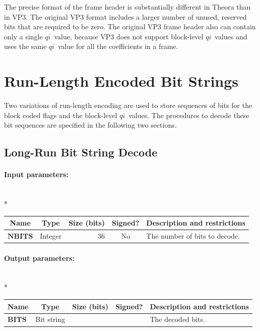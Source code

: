 \documentclass[11pt,letterpaper]{book}
\newcommand{\idx}[1]{{\ensuremath{\mathit{#1}}}}
\newcommand{\qi}{\idx{qi}}
\newcommand{\bitvar}[1]{\ensuremath{\mathbf{\bm #1}}}
\numberwithin{equation}{chapter}
\numberwithin{figure}{chapter}
\numberwithin{table}{chapter}
\begin{document}
The precise format of the frame header is substantially different in Theora
 than in VP3.
The original VP3 format includes a larger number of unused, reserved bits that
 are required to be zero.
The original VP3 frame header also can contain only a single \qi\ value,
 because VP3 does not support block-level \qi\ values and uses the same
 \qi\ value for all the coefficients in a frame.

\section{Run-Length Encoded Bit Strings}

Two variations of run-length encoding are used to store sequences of bits for
 the block coded flags and the block-level \qi\ values.
The procedures to decode these bit sequences are specified in the following two
 sections.

\subsection{Long-Run Bit String Decode}
\label{sub:long-run}

\paragraph{Input parameters:}\hfill\\*
\begin{tabularx}{\textwidth}{@{}llrcX@{}}\toprule
\multicolumn{1}{c}{Name} &
\multicolumn{1}{c}{Type} &
\multicolumn{1}{p{30pt}}{\centering Size (bits)} &
\multicolumn{1}{c}{Signed?} &
\multicolumn{1}{c}{Description and restrictions} \\\midrule\endhead
\bitvar{NBITS}   & Integer & 36 & No & The number of bits to decode. \\
\bottomrule\end{tabularx}

\paragraph{Output parameters:}\hfill\\*
\begin{tabularx}{\textwidth}{@{}llrcX@{}}\toprule
\multicolumn{1}{c}{Name} &
\multicolumn{1}{c}{Type} &
\multicolumn{1}{p{30pt}}{\centering Size (bits)} &
\multicolumn{1}{c}{Signed?} &
\multicolumn{1}{c}{Description and restrictions} \\\midrule\endhead
\bitvar{BITS}    & Bit string &    &    & The decoded bits. \\
\bottomrule\end{tabularx}
\end{document}
